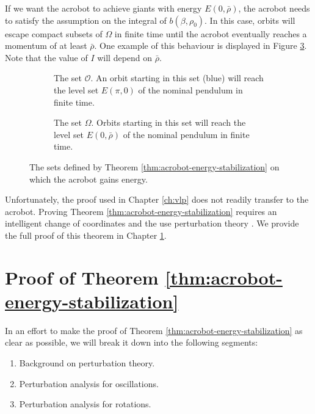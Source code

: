 If we want the acrobot to achieve giants with energy
\(E(0,\bar{\rho})\), the acrobot needs to satisfy the assumption on the
integral of \(b(\beta,\rho_0)\).
In this case, orbits will escape compact subsets of \(\Omega\) in finite time
until the acrobot eventually reaches a momentum of at least \(\bar{\rho}\).
One example of this behaviour is displayed in Figure \ref{fig:acrobot-omega}.
Note that the value of \(I\) will depend on \(\bar{\rho}\).

\begin{figure}
    \centering
    \begin{subfigure}[t]{0.45\textwidth}
        
        \caption{The set \(\mathcal{O}\). An orbit starting in this set (blue)
            will reach the level set \(E(\pi,0)\) of the nominal pendulum in
            finite time.}
        \label{fig:acrobot-oscillation-domain}
    \end{subfigure}
    \hfill
    \begin{subfigure}[t]{0.45\textwidth}
        
        \caption{The set \(\Omega\). Orbits starting in this set will
            reach the level set \(E(0,\bar{\rho})\) of the nominal pendulum in
            finite time.}
            \label{fig:acrobot-omega}
    \end{subfigure}
    \caption{The sets defined by Theorem \ref{thm:acrobot-energy-stabilization}
        on which the acrobot gains energy.}
\end{figure}

Unfortunately, the proof used in Chapter \ref{ch:vlp} does not
readily transfer to the acrobot.
Proving Theorem \ref{thm:acrobot-energy-stabilization} requires an intelligent
change of coordinates and the use perturbation
theory \cite{khalil_nonlinear}.
We provide the full proof of this theorem in Chapter \ref{sec:acrobot-proof}.
 
\section{Proof of Theorem \ref{thm:acrobot-energy-stabilization}}\label{sec:acrobot-proof}
In an effort to make the proof of Theorem \ref{thm:acrobot-energy-stabilization}
as clear as possible, we will break it down into the following segments:
\begin{enumerate}
    \item Background on perturbation theory.
    \item Perturbation analysis for oscillations.
    \item Perturbation analysis for rotations.
\end{enumerate}

